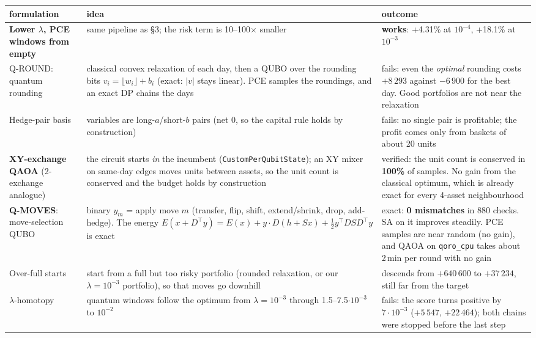 \documentclass[11pt]{article}
\begin{document}
\begin{center}\small
\renewcommand{\arraystretch}{1.18}
\begin{tabularx}{\textwidth}{@{}>{\raggedright\arraybackslash}p{30mm}L>{\raggedright\arraybackslash}p{44mm}@{}}
\toprule
formulation & idea & outcome\\
\midrule
\textbf{Lower $\lambda$, PCE windows from empty} & same pipeline as \S3; the risk term is 10--100$\times$ smaller & \textcolor{good}{\textbf{works}}: +4.31\% at $10^{-4}$, +18.1\% at $10^{-3}$\\
Q-ROUND: quantum rounding & classical convex relaxation of each day, then a QUBO over the rounding bits $v_i=\lfloor w_i\rfloor+b_i$ (exact: $|v|$ stays linear). PCE samples the roundings, and an exact DP chains the days & \textcolor{bad}{fails}: even the \emph{optimal} rounding costs $+8\,293$ against $-6\,900$ for the best day. Good portfolios are not near the relaxation\\
Hedge-pair basis & variables are long-$a$/short-$b$ pairs (net 0, so the capital rule holds by construction) & \textcolor{bad}{fails}: no single pair is profitable; the profit comes only from baskets of about 20 units\\
\textbf{XY-exchange QAOA} (2-exchange analogue) & the circuit starts \emph{in} the incumbent (\texttt{CustomPerQubitState}); an XY mixer on same-day edges moves units between assets, so the unit count is conserved and the budget holds by construction & verified: the unit count is conserved in \textbf{100\%} of samples. No gain from the classical optimum, which is already exact for every 4-asset neighbourhood\\
\textbf{Q-MOVES}: move-selection QUBO & binary $y_m$ = apply move $m$ (transfer, flip, shift, extend/shrink, drop, add-hedge). The energy $E(x{+}D^\top y)=E(x)+y\cdot D(h{+}Sx)+\tfrac12 y^\top DSD^\top y$ is exact & exact: \textbf{0 mismatches} in 880 checks. SA on it improves steadily. PCE samples are near random (no gain), and QAOA on \texttt{qoro\_cpu} takes about 2\,min per round with no gain\\
Over-full starts & start from a full but too risky portfolio (rounded relaxation, or our $\lambda=10^{-3}$ portfolio), so that moves go downhill & descends from $+640\,600$ to $+37\,234$, still far from the target\\
$\lambda$-homotopy & quantum windows follow the optimum from $\lambda=10^{-3}$ through 1.5--7.5$\cdot10^{-3}$ to $10^{-2}$ & \textcolor{bad}{fails}: the score turns positive by $7\cdot10^{-3}$ ($+5\,547$, $+22\,464$); both chains were stopped before the last step\\
\bottomrule
\end{tabularx}
\end{center}
\end{document}
